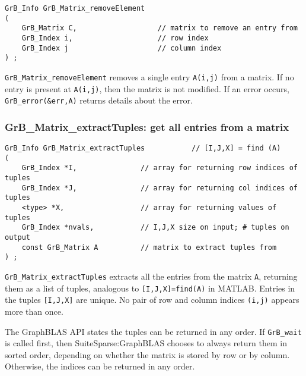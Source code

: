 \documentclass[12pt]{article}
\begin{document}
\begin{mdframed}[userdefinedwidth=6in]
{\footnotesize
\begin{verbatim}
GrB_Info GrB_Matrix_removeElement
(
    GrB_Matrix C,                   // matrix to remove an entry from
    GrB_Index i,                    // row index
    GrB_Index j                     // column index
) ;
\end{verbatim} } \end{mdframed}

\verb'GrB_Matrix_removeElement' removes a single entry \verb'A(i,j)' from a
matrix.  If no entry is present at \verb'A(i,j)', then the matrix is not
modified.  If an error occurs, \verb'GrB_error(&err,A)' returns details about
the error.

\subsubsection{{\sf GrB\_Matrix\_extractTuples:} get all entries from a matrix}
\label{matrix_extractTuples}

\begin{mdframed}[userdefinedwidth=6in]
{\footnotesize
\begin{verbatim}
GrB_Info GrB_Matrix_extractTuples           // [I,J,X] = find (A)
(
    GrB_Index *I,               // array for returning row indices of tuples
    GrB_Index *J,               // array for returning col indices of tuples
    <type> *X,                  // array for returning values of tuples
    GrB_Index *nvals,           // I,J,X size on input; # tuples on output
    const GrB_Matrix A          // matrix to extract tuples from
) ;
\end{verbatim} } \end{mdframed}

\verb'GrB_Matrix_extractTuples' extracts all the entries from the matrix
\verb'A', returning them as a list of tuples, analogous to
\verb'[I,J,X]=find(A)' in MATLAB.  Entries in the tuples \verb'[I,J,X]' are
unique.  No pair of row and column indices \verb'(i,j)' appears more than once.

The GraphBLAS API states the tuples can be returned in any order.  If
\verb'GrB_wait' is called first, then SuiteSparse:GraphBLAS chooses to
always return them in sorted order, depending on whether the matrix is stored
by row or by column.  Otherwise, the indices can be returned in any order.
\end{document}

